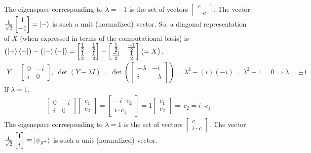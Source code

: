 The eigenspace corresponding to $\lambda = -1$ is the set of vectors $\begin{bmatrix}c \\ -c\end{bmatrix}$.  The vector $\frac{1}{\sqrt{2}}\begin{bmatrix} 1 \\ -1\end{bmatrix} = \ket{-}$ is such a unit (normalized) vector.  So, a diagonal representation of $X$ (when expressed in terms of the computational basis) is $\bigl(\ket{+}\bra{+}\bigr)-\bigl(\ket{-}\bra{-}\bigr) = \begin{bmatrix}\frac{1}{2} & \frac{1}{2} \\ \frac{1}{2} & \frac{1}{2}\end{bmatrix} - \begin{bmatrix} \frac{1}{2} & \frac{-1}{2} \\ \frac{-1}{2} & \frac{1}{2}\end{bmatrix} \bigl( = X\bigr)$.
\begin{align*}
	Y = \begin{bmatrix}
	0 & -i \\
	i & 0
	\end{bmatrix},\ \det(Y-\lambda I) =
	\det \left(\begin{bmatrix}
	-\lambda & -i \\
	i & -\lambda
	\end{bmatrix} \right) = \lambda^2-(i)(-i)=\lambda^2 - 1 = 0 \Rightarrow \lambda = \pm 1
\end{align*}
If $\lambda = 1$,
\begin{align*}
	\begin{bmatrix}
		0 & -i \\
		i & 0
	\end{bmatrix}
	\begin{bmatrix}
		c_1 \\
		c_2
	\end{bmatrix} =
	\begin{bmatrix}
	      -i\cdot c_2 \\
	      i\cdot c_1
	\end{bmatrix} =
	 1
	\begin{bmatrix}
		c_1 \\
		c_2
	\end{bmatrix}
	\Rightarrow c_2 = i\cdot c_1
\end{align*}
The eigenspace corresponding to $\lambda = 1$ is the set of vectors $\begin{bmatrix}c \\ i\cdot c\end{bmatrix}$.  The vector $\frac{1}{\sqrt{2}}\begin{bmatrix} 1 \\ i\end{bmatrix}\equiv\ket{\psi_{y^+}}$ is such a unit (normalized) vector. 
